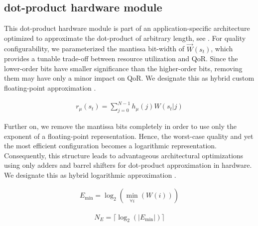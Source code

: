 \subsection{dot-product hardware module}
This dot-product hardware module is part of an application-specific architecture optimized to approximate the dot-product of arbitrary length, see . For quality configurability, we parameterized the mantissa bit-width of $\vec{W}(s_t)$, which provides a tunable trade-off between resource utilization and QoR. Since the lower-order bits have smaller significance than the higher-order bits, removing them may have only a minor impact on QoR. We designate this as hybrid custom floating-point approximation .

\begin{eqnarray} \label{eq:dot_product}
r_{\mu}\left(s_t\right)=\sum_{j=0}^{N-1}h_{\mu}(j)W(s_t|j)
\end{eqnarray}

Further on, we remove the mantissa bits completely in order to use only the exponent of a floating-point representation. Hence, the worst-case quality and yet the most efficient configuration becomes a logarithmic representation. Consequently, this structure leads to advantageous architectural optimizations using only adders and barrel shifters for dot-product approximation in hardware. We designate this as hybrid logarithmic approximation .


\begin{eqnarray} \label{eq:exp_max}
E_{\min}=\log _2(\min_{\forall i}(W(i)))
\end{eqnarray}

\begin{eqnarray} \label{eq:bits_exp}
N_E=\lceil\log_2(|E_{\min}|)\rceil
\end{eqnarray}

